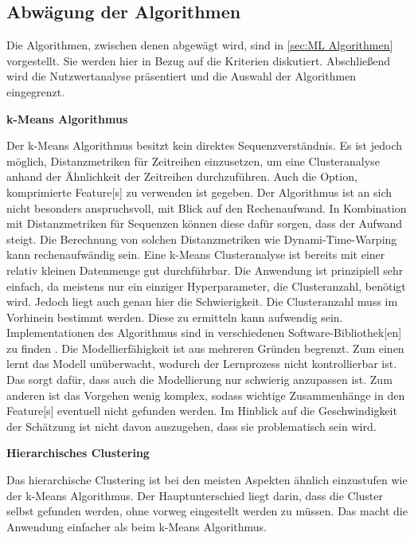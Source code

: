 \subsection{Abwägung der Algorithmen}
Die Algorithmen, zwischen denen abgewägt wird, sind in \autoref{sec:ML Algorithmen} vorgestellt. Sie werden hier in Bezug auf die Kriterien diskutiert. Abschließend wird die Nutzwertanalyse präsentiert und die Auswahl der Algorithmen eingegrenzt. \dubpar

\textbf{k-Means Algorithmus}\par
Der k-Means Algorithmus besitzt kein direktes Sequenzverständnis. Es ist jedoch möglich, Distanzmetriken für Zeitreihen einzusetzen, um eine Clusteranalyse anhand der Ähnlichkeit der Zeitreihen durchzuführen. Auch die Option, komprimierte \gls{Feature}[s] zu verwenden ist gegeben. Der Algorithmus ist an sich nicht besonders anspruchsvoll, mit Blick auf den Rechenaufwand. In Kombination mit Distanzmetriken für Sequenzen können diese dafür sorgen, dass der Aufwand steigt. Die Berechnung von solchen Distanzmetriken wie Dynami-Time-Warping kann rechenaufwändig sein. Eine k-Means Clusteranalyse ist bereits mit einer relativ kleinen Datenmenge gut durchführbar. Die Anwendung ist prinzipiell sehr einfach, da meistens nur ein einziger \gls{Hyperparameter}, die Clusteranzahl, benötigt wird. Jedoch liegt auch genau hier die Schwierigkeit. Die Clusteranzahl muss im Vorhinein bestimmt werden. Diese zu ermitteln kann aufwendig sein. Implementationen des Algorithmus sind in verschiedenen Software-\gls{Bibliothek}[en] zu finden \cite{FabianPedregosa.2011}. Die Modellierfähigkeit ist aus mehreren Gründen begrenzt. Zum einen lernt das Modell unüberwacht, wodurch der Lernprozess nicht kontrollierbar ist. Das sorgt dafür, dass auch die Modellierung nur schwierig anzupassen ist. Zum anderen ist das Vorgehen wenig komplex, sodass wichtige Zusammenhänge in den \gls{Feature}[s] eventuell nicht gefunden werden. Im Hinblick auf die Geschwindigkeit der Schätzung ist nicht davon auszugehen, dass sie problematisch sein wird.\dubpar

\textbf{Hierarchisches Clustering}\par
Das hierarchische Clustering ist bei den meisten Aspekten ähnlich einzustufen wie der k-Means Algorithmus. Der Hauptunterschied liegt darin, dass die Cluster selbst gefunden werden, ohne vorweg eingestellt werden zu müssen. Das macht die Anwendung einfacher als beim k-Means Algorithmus.\dubpar

